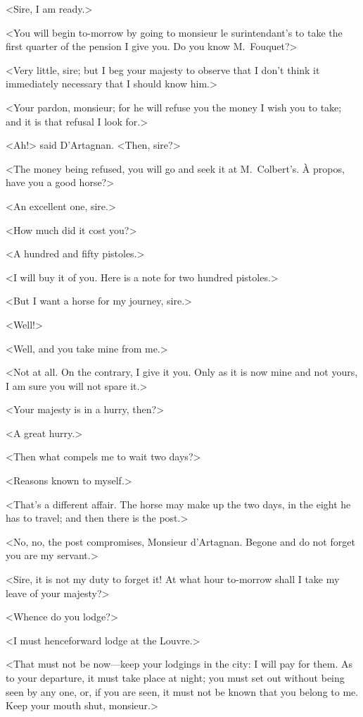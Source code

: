 <Sire, I am ready.>

<You will begin to-morrow by going to monsieur le surintendant's to take the first quarter of the pension I give you. Do you know M.~Fouquet?>

<Very little, sire; but I beg your majesty to observe that I don't think it immediately necessary that I should know him.>

<Your pardon, monsieur; for he will refuse you the money I wish you to take; and it is that refusal I look for.>

<Ah!> said D'Artagnan. <Then, sire?>

<The money being refused, you will go and seek it at M.~Colbert's. À propos, have you a good horse?>

<An excellent one, sire.>

<How much did it cost you?>

<A hundred and fifty pistoles.>

<I will buy it of you. Here is a note for two hundred pistoles.>

<But I want a horse for my journey, sire.>

<Well!>

<Well, and you take mine from me.>

<Not at all. On the contrary, I give it you. Only as it is now mine and not yours, I am sure you will not spare it.>

<Your majesty is in a hurry, then?>

<A great hurry.>

<Then what compels me to wait two days?>

<Reasons known to myself.>

<That's a different affair. The horse may make up the two days, in the eight he has to travel; and then there is the post.>

<No, no, the post compromises, Monsieur d'Artagnan. Begone and do not forget you are my servant.>

<Sire, it is not my duty to forget it! At what hour to-morrow shall I take my leave of your majesty?>

<Whence do you lodge?>

<I must henceforward lodge at the Louvre.>

<That must not be now—keep your lodgings in the city: I will pay for them. As to your departure, it must take place at night; you must set out without being seen by any one, or, if you are seen, it must not be known that you belong to me. Keep your mouth shut, monsieur.>


